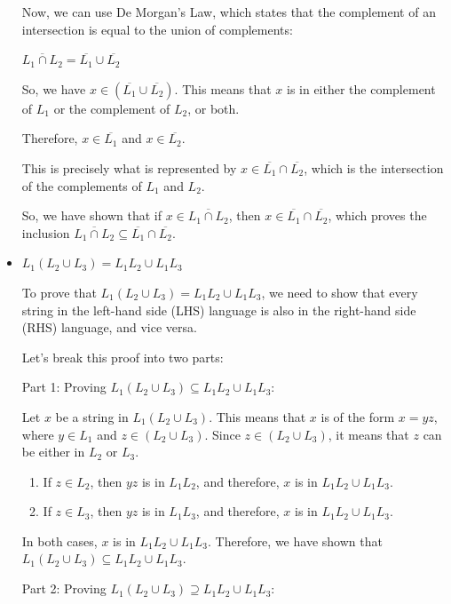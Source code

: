 \documentclass{article}
\begin{document}
\begin{itemize}
  Now, we can use De Morgan's Law, which states that the complement of an intersection is equal to the union of complements:
  
  $\overline{L_1 \cap L_2} = \overline{L_1} \cup \overline{L_2}$
  
  So, we have $x \in (\overline{L_1} \cup \overline{L_2})$. This means that $x$ is in either the complement of $L_1$ or the complement of $L_2$, or both.
  
  Therefore, $x \in \overline{L_1}$ and $x \in \overline{L_2}$.
  
  This is precisely what is represented by $x \in \overline{L_1} \cap \overline{L_2}$, which is the intersection of the complements of $L_1$ and $L_2$.
  
  So, we have shown that if $x \in \overline{L_1 \cap L_2}$, then $x \in \overline{L_1} \cap \overline{L_2}$, which proves the inclusion $\overline{L_1 \cap L_2} \subseteq \overline{L_1} \cap \overline{L_2}$.

  \item $L_1(L_2 \cup L_3) = L_1L_2 \cup L_1L_3$
  
  To prove that $L_1(L_2 \cup L_3) = L_1L_2 \cup L_1L_3$, we need to show that every string in the left-hand side (LHS) language is also in the right-hand side (RHS) language, and vice versa.

  Let's break this proof into two parts:
  
  Part 1: Proving $L_1(L_2 \cup L_3) \subseteq L_1L_2 \cup L_1L_3$:
  
  Let $x$ be a string in $L_1(L_2 \cup L_3)$. This means that $x$ is of the form $x = yz$, where $y \in L_1$ and $z \in (L_2 \cup L_3)$. Since $z \in (L_2 \cup L_3)$, it means that $z$ can be either in $L_2$ or $L_3$.
  
  \begin{enumerate}
    \item If $z \in L_2$, then $yz$ is in $L_1L_2$, and therefore, $x$ is in $L_1L_2 \cup L_1L_3$.
    
    \item If $z \in L_3$, then $yz$ is in $L_1L_3$, and therefore, $x$ is in $L_1L_2 \cup L_1L_3$.
  \end{enumerate}
  
  In both cases, $x$ is in $L_1L_2 \cup L_1L_3$. Therefore, we have shown that $L_1(L_2 \cup L_3) \subseteq L_1L_2 \cup L_1L_3$.
  
  Part 2: Proving $L_1(L_2 \cup L_3) \supseteq L_1L_2 \cup L_1L_3$:
  

\end{itemize}
\end{document}
